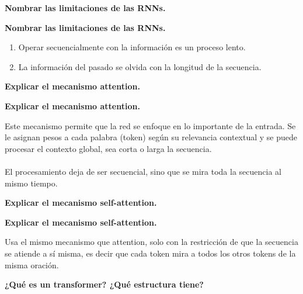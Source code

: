 \documentclass[10pt]{memoir}
\begin{document}
\clearpage
\begin{center}
	\textbf{\Large }
\end{center}


\clearpage
\begin{center}
	\textbf{\Large Nombrar las limitaciones de las RNNs.}
\end{center}

\clearpage
\begin{center}
	\textbf{\Large Nombrar las limitaciones de las RNNs.}
\end{center}
\begin{enumerate}
	\item Operar secuencialmente con la información es un proceso lento.
	\item La información del pasado se olvida con la longitud de la secuencia.
\end{enumerate}

\clearpage
\begin{center}
	\textbf{\Large Explicar el mecanismo attention.}
\end{center}

\clearpage
\begin{center}
	\textbf{\Large Explicar el mecanismo attention.}
\end{center}
\noindent Este mecanismo permite que la red se enfoque en lo importante de la entrada. Se le asignan pesos a cada palabra (token) según su relevancia contextual y se puede procesar el contexto global, sea corta o larga la secuencia. \\
\\
\noindent El procesamiento deja de ser secuencial, sino que se mira toda la secuencia al mismo tiempo.

\clearpage
\begin{center}
	\textbf{\Large Explicar el mecanismo self-attention.}
\end{center}

\clearpage
\begin{center}
	\textbf{\Large Explicar el mecanismo self-attention.}
\end{center}
\noindent Usa el mismo mecanismo que attention, solo con la restricción de que la secuencia se atiende a sí misma, es decir que cada token mira a todos los otros tokens de la misma oración.

\clearpage
\begin{center}
	\textbf{\Large ¿Qué es un transformer? ¿Qué estructura tiene?}
\end{center}
\end{document}
